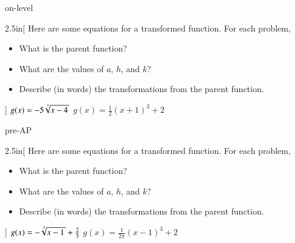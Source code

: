 \begin{taggedblock}{on-level}

    \begin{my2Problems}[\large]{2.5in}[%
        Here are some equations for a transformed function.
        For each problem,
        \vspace{-1em}
        \begin{itemize}[nosep]
            \item What is the parent function?
            \item What are the values of $a$, $h$, and $k$?
            \item Describe (in words) the transformations from the parent function.
        \end{itemize}
        ]
        {
            $g(x) = -5\myRoot[3]{x-4} $
        }
        {
            $g(x) = \frac{1}{2} (x+1)^3 + 2$
        }
    \end{my2Problems}
\end{taggedblock}




\begin{taggedblock}{pre-AP}
    \begin{my2Problems}[\large]{2.5in}[%
        Here are some equations for a transformed function.
        For each problem,
        \vspace{-1em}
        \begin{itemize}[nosep]
            \item What is the parent function?
            \item What are the values of $a$, $h$, and $k$?
            \item Describe (in words) the transformations from the parent function.
        \end{itemize}
        ]
        {
            $g(x) = -\myRoot[3]{x-1} + \frac{2}{3}$
        }
        {
            $g(x) = \frac{1}{2\pi} (x-1)^3 + 2$
        }
    \end{my2Problems}
\end{taggedblock}

